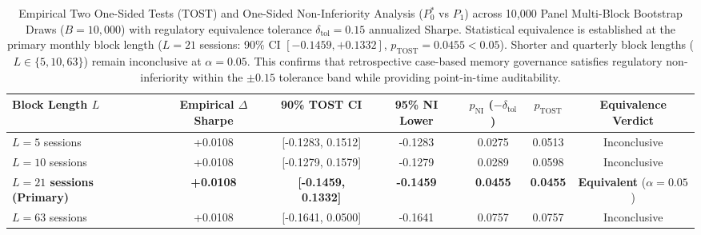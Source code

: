 \begin{table}[ht]
\centering
\small
\begin{tabular}{lcccccc}
\toprule
\textbf{Block Length $L$} & \textbf{Empirical $\Delta$Sharpe} & \textbf{90\% TOST CI} & \textbf{95\% NI Lower} & \textbf{$p_{\text{NI}}$ ($-\delta_{\text{tol}}$)} & \textbf{$p_{\text{TOST}}$} & \textbf{Equivalence Verdict} \\
\midrule
$L = 5$ sessions & +0.0108 & [-0.1283, 0.1512] & -0.1283 & 0.0275 & 0.0513 & Inconclusive \\
$L = 10$ sessions & +0.0108 & [-0.1279, 0.1579] & -0.1279 & 0.0289 & 0.0598 & Inconclusive \\
\textbf{$L = 21$ sessions (Primary)} & \textbf{+0.0108} & \textbf{[-0.1459, 0.1332]} & \textbf{-0.1459} & \textbf{0.0455} & \textbf{0.0455} & \textbf{Equivalent} ($\alpha=0.05$) \\
$L = 63$ sessions & +0.0108 & [-0.1641, 0.0500] & -0.1641 & 0.0757 & 0.0757 & Inconclusive \\
\bottomrule
\end{tabular}
\caption{Empirical Two One-Sided Tests (TOST) and One-Sided Non-Inferiority Analysis ($P_0^*$ vs $P_1$) across 10,000 Panel Multi-Block Bootstrap Draws ($B=10{,}000$) with regulatory equivalence tolerance $\delta_{\text{tol}} = 0.15$ annualized Sharpe. Statistical equivalence is established at the primary monthly block length ($L = 21$ sessions: 90\% CI $[-0.1459, +0.1332]$, $p_{\text{TOST}} = 0.0455 < 0.05$). Shorter and quarterly block lengths ($L \in \{5, 10, 63\}$) remain inconclusive at $\alpha=0.05$. This confirms that retrospective case-based memory governance satisfies regulatory non-inferiority within the $\pm 0.15$ tolerance band while providing point-in-time auditability.}
\label{tab:bootstrap_tost_non_inferiority}
\end{table}
